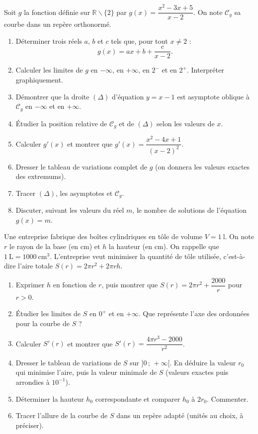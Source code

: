 \documentclass[11pt]{article}
\def\setminus{\mathbin{\backslash}}\let\smallsetminus\setminus
\begin{document}
\begin{exercice}
Soit $g$ la fonction définie sur $\mathbb{R}\setminus\{2\}$ par $g(x)=\dfrac{x^2-3x+5}{x-2}$. On note $\mathscr{C}_g$ sa courbe dans un repère orthonormé.
\begin{enumerate}
\item Déterminer trois réels $a$, $b$ et $c$ tels que, pour tout $x\neq 2$ :
\[ g(x)=ax+b+\dfrac{c}{x-2}. \]
\item Calculer les limites de $g$ en $-\infty$, en $+\infty$, en $2^-$ et en $2^+$. Interpréter graphiquement.
\item Démontrer que la droite $(\Delta)$ d'équation $y=x-1$ est asymptote oblique à $\mathscr{C}_g$ en $-\infty$ et en $+\infty$.
\item Étudier la position relative de $\mathscr{C}_g$ et de $(\Delta)$ selon les valeurs de $x$.
\item Calculer $g'(x)$ et montrer que $g'(x)=\dfrac{x^2-4x+1}{(x-2)^2}$.
\item Dresser le tableau de variations complet de $g$ (on donnera les valeurs exactes des extremums).
\item Tracer $(\Delta)$, les asymptotes et $\mathscr{C}_g$.
\item Discuter, suivant les valeurs du réel $m$, le nombre de solutions de l'équation $g(x)=m$.
\end{enumerate}
\end{exercice}

\begin{exercice}
Une entreprise fabrique des boîtes cylindriques en tôle de volume $V=\SI{1}{\litre}$. On note $r$ le rayon de la base (en \si{\centi\metre}) et $h$ la hauteur (en \si{\centi\metre}). On rappelle que $1~\text{L}=1000~\text{cm}^3$. L'entreprise veut minimiser la quantité de tôle utilisée, c'est-à-dire l'aire totale $S(r)=2\pi r^2+2\pi r h$.
\begin{enumerate}
\item Exprimer $h$ en fonction de $r$, puis montrer que $S(r)=2\pi r^2+\dfrac{2000}{r}$ pour $r>0$.
\item Étudier les limites de $S$ en $0^+$ et en $+\infty$. Que représente l'axe des ordonnées pour la courbe de $S$ ?
\item Calculer $S'(r)$ et montrer que $S'(r)=\dfrac{4\pi r^3-2000}{r^2}$.
\item Dresser le tableau de variations de $S$ sur $]0\,;\,+\infty[$. En déduire la valeur $r_0$ qui minimise l'aire, puis la valeur minimale de $S$ (valeurs exactes puis arrondies à $10^{-1}$).
\item Déterminer la hauteur $h_0$ correspondante et comparer $h_0$ à $2r_0$. Commenter.
\item Tracer l'allure de la courbe de $S$ dans un repère adapté (unités au choix, à préciser).
\end{enumerate}
\end{exercice}
\end{document}
